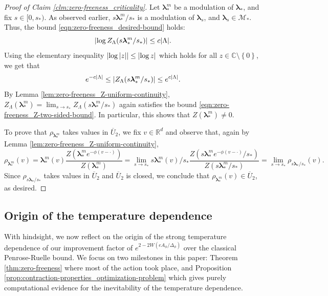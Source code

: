 \documentclass[11pt]{article}
\newcommand{\R}{\mathbb R}
\newcommand{\C}{\mathbb C}
\newcommand{\bl}{\bm{\lambda}}
\newcommand{\pwcc}{\Delta_{\phi}}
\newcommand{\aconst}{A_{\phi}}
\newcommand{\set}[1]{\left\{#1\right\}}
\numberwithin{equation}{section}
\theoremstyle{plain}
\theoremstyle{definition}
\theoremstyle{remark}
\begin{document}
\begin{proof}[Proof of Claim \ref{clm:zero-freeness_criticality}]
Let $\bl_{\ast}^{m}$ be a modulation of $\bl_{\ast}$, and fix $s\in[0,s_{\ast})$.
As observed earlier, $s\bl_{\ast}^{m}/s_{\ast}$ is a modulation of $\bl_{s}$, and $\bl_{s}\in\mathcal{M}_{\ast}$.
Thus, the bound \eqref{eqn:zero-freeness_desired-bound} holds:
\begin{equation}
\abs{\log Z_{\Lambda}(s\bl_{\ast}^{m}/s_{\ast})}\le c\abs{\Lambda}.
\end{equation}
Using the elementary inequality $\abs{\log\abs{z}}\le\abs{\log z}$ which holds for all $z\in\C\setminus\set{0}$, we get that 
\begin{equation}
\label{eqn:zero-freeness_Z-two-sided-bound}
e^{-c\abs{\Lambda}}\le\abs{Z_{\Lambda}(s\bl_{\ast}^{m}/s_{\ast})}\le e^{c\abs{\Lambda}}.
\end{equation}
By Lemma \ref{lem:zero-freeness_Z-uniform-continuity}, $Z_{\Lambda}(\bl_{\ast}^{m})=\lim_{s\rightarrow s_{\ast}}Z_{\Lambda}(s\bl_{\ast}^{m}/s_{\ast})$ again satisfies the bound \eqref{eqn:zero-freeness_Z-two-sided-bound}.
In particular, this shows that $Z(\bl_{\ast}^{m})\ne 0$.

To prove that $\rho_{\bl_{\ast}^{m}}$ takes values in $\overline{U}_{2}$, we fix $v\in\R^{d}$ and observe that, again by Lemma \ref{lem:zero-freeness_Z-uniform-continuity},
\begin{equation}
\rho_{\bl_{\ast}^{m}}(v)
=\bl_{\ast}^{m}(v)\frac{Z(\bl_{\ast}^{m}e^{-\phi(v-\cdot)})}{Z(\bl_{\ast}^{m})}
=\lim_{s\rightarrow s_{\ast}}s\bl_{\ast}^{m}(v)/s_{\ast}\frac{Z(s\bl_{\ast}^{m}e^{-\phi(v-\cdot)}/s_{\ast})}{Z(s\bl_{\ast}^{m}/s_{\ast})}
=\lim_{s\rightarrow s_{\ast}}\rho_{s\bl_{\ast}/s_{\ast}}(v).
\end{equation}
Since $\rho_{s\bl_{\ast}/s_{\ast}}$ takes values in $\overline{U}_{2}$ and $\overline{U}_{2}$ is closed, we conclude that $\rho_{\bl_{\ast}^{m}}(v)\in\overline{U}_{2}$, as desired.
\end{proof}



\subsection{Origin of the temperature dependence}
\label{sec:zero-freeness_origin}

With hindsight, we now reflect on the origin of the strong temperature dependence of our improvement factor of $e^{2-2W(e\aconst/\pwcc)}$ over the classical Penrose-Ruelle bound.
We focus on two milestones in this paper: Theorem \ref{thm:zero-freeness} where most of the action took place, and Proposition \ref{prop:contraction-properties_optimization-problem} which gives purely computational evidence for the inevitability of the temperature dependence.
\end{document}
